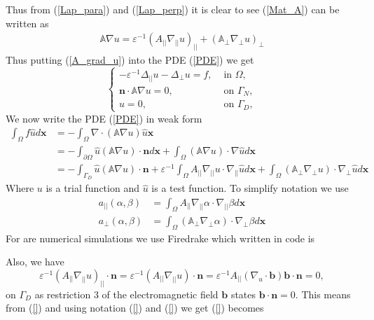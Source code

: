 \documentclass[12pt]{ociamthesis}
\begin{document}
Thus from (\ref{Lap_para}) and (\ref{Lap_perp}) it is clear to see (\ref{Mat_A}) can be written as
\begin{align} \label{A_grad_u}
\mathbb{A} \nabla u = 
\varepsilon^{-1}(A_{||}\nabla_{||} u)_{||} + 
(\mathbb{A}_{\perp}\nabla_{\perp}u)_{\perp} 
\end{align}
Thus putting (\ref{A_grad_u}) into the PDE (\ref{PDE}) we get
\begin{equation}
\begin{cases}
-\varepsilon^{-1} \Delta_{||}u - \Delta_{\perp}u = f, & \text{ in }\Omega,\\
\mathbf{n}\cdot \mathbb{A}\nabla u = 0, & \text{ on }\Gamma_N, \\
u = 0, & \text{  on }\Gamma_D,
\end{cases}
\end{equation}
We now write the PDE (\ref{PDE}) in weak form
\begin{align}
\int_{\Omega}f\hat{u}d\mathbf{x} &= - \int_{\Omega} \nabla \cdot (\mathbb{A} \nabla u) \hat{u} \mathbf{x}\\
&= - \int_{\partial \Omega} \hat{u} (\mathbb{A} \nabla u) \cdot \mathbf{n} d\mathbf{x}
+ \int_{\Omega}(\mathbb{A}\nabla u)\cdot \nabla \hat{u} d \mathbf{x}\\
&= - \int_{\Gamma_D} \hat{u} (\mathbb{A}\nabla u) \cdot \mathbf{n} + 
\varepsilon^{-1}\int_{\Omega} A_{||} \nabla_{||}u \cdot \nabla_{||}\hat{u} d\mathbf{x} +
\int_{\Omega}(\mathbb{A}_{\perp} \nabla_{\perp} u )\cdot \nabla_{\perp} \hat{u} d\mathbf{x}
\end{align}
Where $u$ is a trial function and $\hat{u}$ is a test function. To simplify notation we use
\begin{align}
a_{||}(\alpha, \beta) &= \int_{\Omega} A_{||} \nabla_{||}\alpha \cdot \nabla_{||}\beta d\mathbf{x} \\
a_{\perp}(\alpha, \beta) &= \int_{\Omega}(\mathbb{A}_{\perp} \nabla_{\perp}\alpha )\cdot \nabla_{\perp} \beta d\mathbf{x}
\end{align}
For are numerical simulations we use Firedrake \cite{Dragon} which written in code is 

Also, we have 
\begin{equation}
\varepsilon^{-1} (A_{||}\nabla_{||}u)_{||}\cdot \mathbf{n} = \varepsilon^{-1} (A_{||}\nabla_{||}u)\cdot \mathbf{n} = \varepsilon^{-1} A_{||}(\nabla_u \cdot \mathbf{b}) \mathbf{b} \cdot \mathbf{n} = 0,
\end{equation}
on $\Gamma_D$ as restriction $3$ of the electromagnetic field $\mathbf{b}$ states $\mathbf{b}\cdot \mathbf{n}=0$. This means from (\ref{}) and using notation (\ref{}) and (\ref{}) we get (\ref{}) becomes
\end{document}
